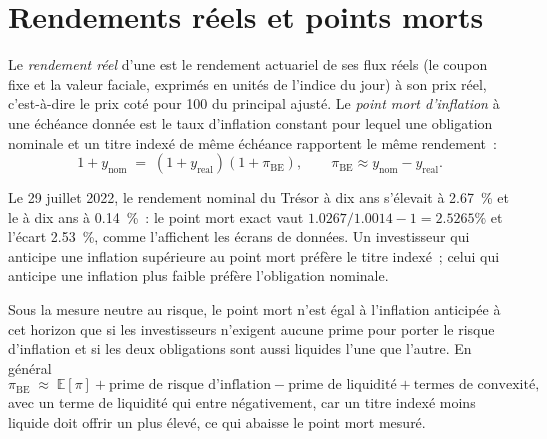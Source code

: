 \section{Rendements réels et points morts}

\begin{definition}\label{def:m2:inflation-markets:breakeven}
Le \emph{rendement réel} d'une  est le rendement
actuariel de ses flux réels (le coupon fixe et la valeur faciale, exprimés en unités
de l'indice du jour) à son prix réel, c'est-à-dire le prix coté pour 100 du
principal ajusté. Le \emph{point mort d'inflation}
à une échéance donnée est le taux d'inflation constant pour lequel une obligation nominale et un titre indexé
de même échéance rapportent le même rendement~:
\begin{equation}\label{eq:m2:inflation-markets:fisher}
1 + y_{\mathrm{nom}} \;=\; (1 + y_{\mathrm{real}})(1 + \pi_{\mathrm{BE}}),
\qquad \pi_{\mathrm{BE}} \approx y_{\mathrm{nom}} - y_{\mathrm{real}}.
\end{equation}
\end{definition}

Le 29 juillet 2022, le rendement nominal du Trésor à dix ans s'élevait à 2.67~\% et le  à dix ans à 0.14~\%~: le point mort exact vaut $1.0267/1.0014 - 1 = 2.5265\%$ et l'écart
2.53~\%, comme l'affichent les écrans de données. Un investisseur qui anticipe une inflation
supérieure au point mort préfère le titre indexé~; celui qui anticipe une inflation plus faible préfère l'obligation nominale.

\begin{proposition}\label{prop:m2:inflation-markets:contents}
Sous la mesure neutre au risque, le point mort n'est égal à l'inflation anticipée à cet horizon
que si les investisseurs n'exigent aucune prime pour porter le risque d'inflation et si les
deux obligations sont aussi liquides l'une que l'autre. En général
\[
\pi_{\mathrm{BE}} \;\approx\; \mathbb{E}[\pi] + \text{prime de risque d'inflation}
- \text{prime de liquidité} + \text{termes de convexité},
\]
avec un terme de liquidité qui entre négativement, car un titre indexé moins liquide doit
offrir un  plus élevé, ce qui abaisse le point mort mesuré.
\end{proposition}

